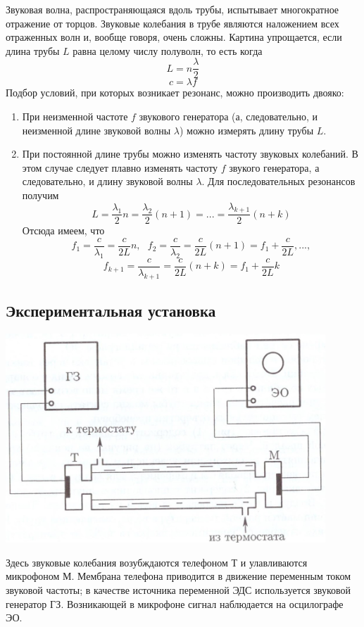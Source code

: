 \documentclass[a4paper, 12pt]{article}%
\begin{document}
Звуковая волна, распространяющаяся вдоль трубы, испытывает многократное отражение от торцов. Звуковые колебания в трубе являются наложением всех отраженных волн и, вообще говоря, очень сложны. Картина упрощается, если длина трубы $L$ равна целому числу полуволн, то есть когда 
\[L = n \dfrac{\lambda}{2}\]
\[c = \lambda f\]
Подбор условий, при которых возникает резонанс, можно производить двояко:
\begin{enumerate}
\item При неизменной частоте $f$ звукового генератора (а, следовательно, и неизменной длине звуковой волны $\lambda$) можно измерять длину трубы $L$.
\item При постоянной длине трубы можно изменять частоту звуковых колебаний. В этом случае следует плавно изменять частоту $f$ звукого генератора, а следовательно, и длину звуковой волны $\lambda$. Для последовательных резонансов получим 
\[L = \dfrac{\lambda_1}{2}n = \dfrac{\lambda_2}{2}(n+1) = ... = \dfrac{\lambda_{k+1}}{2}(n+k)\]
Отсюда имеем, что 
\[f_1 = \dfrac{c}{\lambda_1} = \dfrac{c}{2L}n, \text{ } f_2 = \dfrac{c}{\lambda_2} = \dfrac{c}{2L}(n+1) = f_1 +  \dfrac{c}{2L},...,\]
\[f_{k+1} = \dfrac{c}{\lambda_{k+1}} = \dfrac{c}{2L}(n+k) = f_1 +  \dfrac{c}{2L}k\]  
\end{enumerate}
\subsection*{Экспериментальная установка}
\includegraphics[width = 0.9\textwidth]{213_1.jpg}

Здесь звуковые колебания возубждаются телефоном Т и улавливаются микрофоном М. Мембрана телефона приводится в движение переменным током звуковой частоты; в качестве источника переменной ЭДС используется звуковой генератор ГЗ. Возникающей в микрофоне сигнал наблюдается на осцилографе ЭО.
\end{document}
